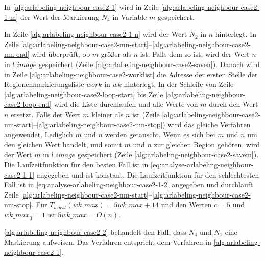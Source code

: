 In \autoref{alg:arlabeling-neighbour-case2-1} wird in Zeile \ref{alg:arlabeling-neighbour-case2-1-m} der Wert der
 Markierung $N_4$ in Variable $m$ gespeichert.

In Zeile \ref{alg:arlabeling-neighbour-case2-1-n} wird der Wert $N_2$ in $n$ hinterlegt. In Zeile
 \ref{alg:arlabeling-neighbour-case2-mn-start}--\ref{alg:arlabeling-neighbour-case2-mn-end} wird überprüft, ob $m$
 größer als $n$ ist. Falls dem so ist, wird der Wert $n$ in $\mathit{l\_image}$ gespeichert
 (Zeile \ref{alg:arlabeling-neighbour-case2-saven}). Danach wird in Zeile \ref{alg:arlabeling-neighbour-case2-worklist}
 die Adresse der ersten Stelle der Regionenmarkierungsliste $\mathit{work}$ in $wk$ hinterlegt. In der Schleife von
 Zeile \ref{alg:arlabeling-neighbour-case2-loop-start} bis Zeile \ref{alg:arlabeling-neighbour-case2-loop-end} wird die
 Liste durchlaufen und alle Werte von $m$ durch den Wert $n$ ersetzt. Falls der Wert $m$ kleiner als $n$ ist
 (Zeile \ref{alg:arlabeling-neighbour-case2-nm-start}--\ref{alg:arlabeling-neighbour-case2-nm-stop}) wird das gleiche
 Verfahren angewendet. Lediglich $m$ und $n$ werden getauscht. Wenn es sich bei $m$ und $n$ um den gleichen Wert
 handelt, und somit $m$ und $n$ zur gleichen Region gehören, wird der Wert $m$ in $\mathit{l\_image}$ gespeichert
 (Zeile \ref{alg:arlabeling-neighbour-case2-savem}). Die Laufzeitfunktion für den besten Fall ist in
 \autoref{eq:analyse-arlabeling-neighbour-case2-1-1} angegeben und ist konstant. Die Laufzeitfunktion für den
 schlechtesten Fall ist in \autoref{eq:analyse-arlabeling-neighbour-case2-1-2} angegeben und durchläuft Zeile
 \ref{alg:arlabeling-neighbour-case2-nm-start}--\ref{alg:arlabeling-neighbour-case2-nm-stop}. Für
 $T_{worst}(\mathit{wk\_max})=5 \mathit{wk\_max} + 14$ und den Werten $c =5$ und
 $\mathit{wk\_max}_{0} = 1$ ist $5 \mathit{wk\_max} = O(n)$.


\autoref{alg:arlabeling-neighbour-case2-2} behandelt den Fall, dass $N_4$ und $N_1$ eine Markierung aufweisen. Das Verfahren entspricht dem Verfahren in \autoref{alg:arlabeling-neighbour-case2-1}.


